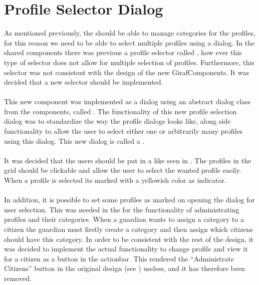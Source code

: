 
\section{Profile Selector Dialog}
\label{sec:profile_selector_dialog}

As mentioned previously, the \ct should be able to manage categories for the profiles, for this reason we need to be able to select multiple profiles using a dialog. In the shared components there was previous a profile selector called , how ever this type of selector does not allow for multiple selection of profiles. Furthermore, this selector was not consistent with the design of the new GirafComponents. It was decided that a new selector should be implemented.
\\\\
This new component was implemented as a dialog using an abstract dialog class from the components, called . The functionality of this new profile selection dialog was to standardize the way the profile dialogs looks like, along side functionality to allow the user to select either one or arbitrarily many profiles using this dialog. This new dialog is called a .
\\\\
It was decided that the users should be put in a  like seen in . The profiles in the grid should be clickable and allow the user to select the wanted profile easily. When a profile is selected its marked with a yellowish color as indicator.
\\\\
In addition, it is possible to set some profiles as marked on opening the dialog for user selection. This was needed in the \ct for the functionality of administrating profiles and their categories. When a guardian wants to assign a category to a citizen the guardian must firstly create a category and then assign which citizens should have this category. In order to be consistent with the rest of the design, it was decided to implement the actual functionality to change profile and view it for a citizen as a button in the actionbar. This rendered the ``Administrate Citizens'' button in the original design (see ) useless, and it has therefore been removed. 
